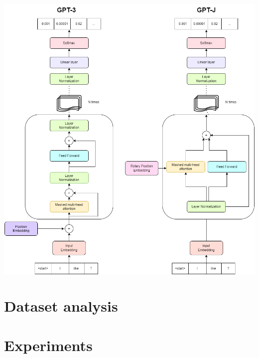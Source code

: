 \documentclass{article}
\begin{document}
\includegraphics[width=\textwidth]{gptJ_vs_gpt_architecture.drawio.png}


\section{Dataset analysis}


\section{Experiments}

 

    
\end{document}
